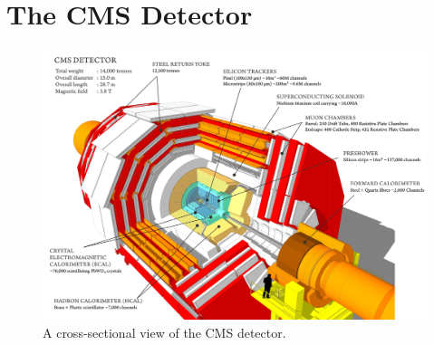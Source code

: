 \newpage

\section{The CMS Detector} \label{sec-TheCMSDetector}

\begin{figure} [h!] 
\includegraphics[width=\textwidth]{Figures/CMSDetector.png}
\caption{A cross-sectional view of the CMS detector.}
\label{fig-CMSDetector}
\end{figure}

